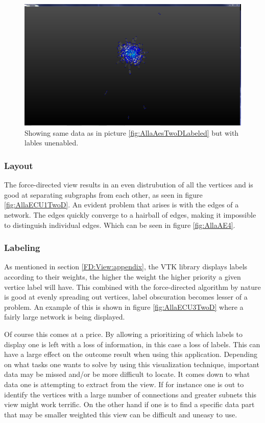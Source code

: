 \documentclass[a4paper,11pt]{kth-mag}
\begin{document}
\begin{figure}[!htbp]
	\centering
	\includegraphics[scale=0.3]{SesammVisualAppPics/2D-View/Unlabled/AE/AllaAE1}
	\caption{Showing same data as in picture \ref{fig:AllaAesTwoDLabeled} but with lables unenabled.}
	\label{fig:AllaAesTwoDUnLabeled}
\end{figure}

\subsubsection{Layout}
The force-directed view results in an even distrubution of all the vertices and is good at separating subgraphs from each other, as seen in figure \ref{fig:AllaECU1TwoD}. An evident problem that 
arises is with the edges of a network. The edges quickly converge to a hairball of edges, making it impossible to distinguish individual edges. Which can be seen in figure \ref{fig:AllaAE4}.

\subsubsection{Labeling}
As mentioned in section \ref{FD:View:appendix}, the VTK library displays labels according to their weights, the higher the weight the higher priority a given vertice label will have. This combined with the force-directed algorithm by nature is good at evenly spreading out vertices, label 
obscuration becomes lesser of a problem. An example of this is shown in figure \ref{fig:AllaECU3TwoD} where a fairly large network is being displayed. 

Of course this comes at a price. By allowing a prioritizing of which labels to display one is left with a
loss of information, in this case a loss of labels. This can have a large effect on the outcome result when using
this application. Depending on what tasks one wants to solve by using this visualization technique, important
data may be missed and/or be more difficult to locate. It comes down to what data one is attempting to extract
from the view. If for instance one is out to identify the vertices with a large number of connections and greater subnets
this view might work terrific. On the other hand if one is to find a specific data part that may be smaller weighted this view can be difficult and uneasy to use.
\end{document}
